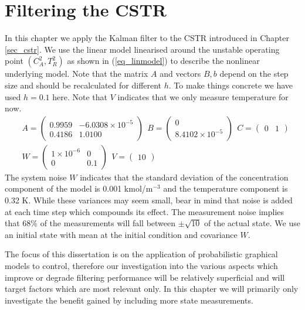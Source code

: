 \section{Filtering the CSTR}
\label{sec_filtering_linmods}
In this chapter we apply the Kalman filter to the CSTR introduced in Chapter \ref{sec_cstr}. We use the linear model linearised around the unstable operating point $(C_A^2, T_R^2)$ as shown in (\ref{eq_linmodel}) to describe the nonlinear underlying model. Note that the matrix $A$ and vectors $B, b$ depend on the step size and should be recalculated for different $h$. To make things concrete we have used $h=0.1$ here. Note that $V$ indicates that we only measure temperature for now.
\begin{equation}
\begin{aligned}
&A = \begin{pmatrix}
0.9959 & -6.0308\times 10^{-5} \\
0.4186 & 1.0100
\end{pmatrix} ~~
B = \begin{pmatrix}
0 \\ 8.4102\times 10^{-5}
\end{pmatrix} ~~
C = \begin{pmatrix}
0 & 1
\end{pmatrix} \\
&W = \begin{pmatrix}
1\times 10^{-6} & 0 \\ 0 & 0.1
\end{pmatrix} ~~
V = \begin{pmatrix}
10
\end{pmatrix}
\end{aligned}
\label{eq_linmodel}
\end{equation}
The system noise $W$ indicates that the standard deviation of the concentration component of the model is 0.001 kmol/m$^{-3}$ and the temperature component is 0.32 K. While these variances may seem small, bear in mind that noise is added at each time step which compounds its effect. The measurement noise implies that 68\% of the measurements will fall between $\pm\sqrt{10}$ of the actual state. We use an initial state with mean at the initial condition and covariance $W$.

The focus of this dissertation is on the application of probabilistic graphical models to control, therefore our investigation into the various aspects which improve or degrade filtering performance will be relatively superficial and will target factors which are most relevant only. In this chapter we will primarily only investigate the benefit gained by including more state measurements.

